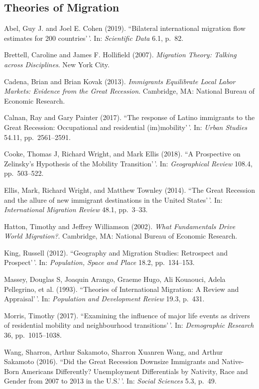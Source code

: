 \documentclass[11pt,]{article}
\begin{document}
\hypertarget{theories-of-migration}{%
\subsection{Theories of Migration}\label{theories-of-migration}}

Abel, Guy J. and Joel E. Cohen (2019). ``Bilateral international
migration flow estimates for 200 countries'\,'. In:
\emph{Scientific Data} 6.1, p.~82.

Brettell, Caroline and James F. Hollifield (2007).
\emph{Migration Theory: Talking across Disciplines}. New York City.

Cadena, Brian and Brian Kovak (2013).
\emph{Immigrants Equilibrate Local Labor Markets: Evidence from the Great Recession}.
Cambridge, MA: National Bureau of Economic Research.

Calnan, Ray and Gary Painter (2017). ``The response of Latino immigrants
to the Great Recession: Occupational and residential (im)mobility'\,'.
In: \emph{Urban Studies} 54.11, pp.~2561--2591.

Cooke, Thomas J, Richard Wright, and Mark Ellis (2018). ``A Prospective
on Zelinsky's Hypothesis of the Mobility Transition'\,'. In:
\emph{Geographical Review} 108.4, pp.~503--522.

Ellis, Mark, Richard Wright, and Matthew Townley (2014). ``The Great
Recession and the allure of new immigrant destinations in the United
States'\,'. In: \emph{International Migration Review} 48.1, pp.~3--33.

Hatton, Timothy and Jeffrey Williamson (2002).
\emph{What Fundamentals Drive World Migration?}. Cambridge, MA: National
Bureau of Economic Research.

King, Russell (2012). ``Geography and Migration Studies: Retrospect and
Prospect'\,'. In: \emph{Population, Space and Place} 18.2, pp.~134--153.

Massey, Douglas S, Joaquin Arango, Graeme Hugo, Ali Kouaouci, Adela
Pellegrino, et al. (1993). ``Theories of International Migration: A
Review and Appraisal'\,'. In: \emph{Population and Development Review}
19.3, p.~431.

Morris, Timothy (2017). ``Examining the influence of major life events
as drivers of residential mobility and neighbourhood transitions'\,'.
In: \emph{Demographic Research} 36, pp.~1015--1038.

Wang, Sharron, Arthur Sakamoto, Sharron Xuanren Wang, and Arthur
Sakamoto (2016). ``Did the Great Recession Downsize Immigrants and
Native-Born Americans Differently? Unemployment Differentials by
Nativity, Race and Gender from 2007 to 2013 in the U.S.'\,'. In:
\emph{Social Sciences} 5.3, p.~49.
\end{document}
